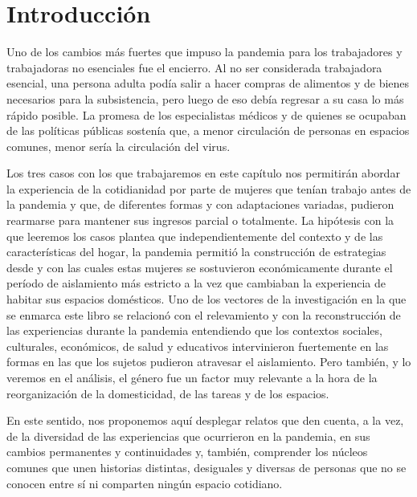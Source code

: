 
\begin{refsection}

\label{cap-28}


\section[Introducción]{Introducción}
\label{cap-28.introduccion}
Uno de los cambios más fuertes que impuso la pandemia para los trabajadores y trabajadoras no esenciales fue el encierro. Al no ser considerada trabajadora esencial, una persona adulta podía salir a hacer compras de alimentos y de bienes necesarios para la subsistencia, pero luego de eso debía regresar a su casa lo más rápido posible. La promesa de los especialistas médicos y de quienes se ocupaban de las políticas públicas sostenía que, a menor circulación de personas en espacios comunes, menor sería la circulación del virus.

Los tres casos con los que trabajaremos en este capítulo nos permitirán abordar la experiencia de la cotidianidad por parte de mujeres que tenían trabajo antes de la pandemia y que, de diferentes formas y con adaptaciones variadas, pudieron rearmarse para mantener sus ingresos parcial o totalmente. La hipótesis con la que leeremos los casos plantea que independientemente del contexto y de las características del hogar, la pandemia permitió la construcción de estrategias desde y con las cuales estas mujeres se sostuvieron económicamente durante el período de aislamiento más estricto a la vez que cambiaban la experiencia de habitar sus espacios domésticos. Uno de los vectores de la investigación en la que se enmarca este libro se relacionó con el relevamiento y con la reconstrucción de las experiencias durante la pandemia entendiendo que los contextos sociales, culturales, económicos, de salud y educativos intervinieron fuertemente en las formas en las que los sujetos pudieron atravesar el aislamiento. Pero también, y lo veremos en el análisis, el género fue un factor muy relevante a la hora de la reorganización de la domesticidad, de las tareas y de los espacios.

En este sentido, nos proponemos aquí desplegar relatos que den cuenta, a la vez, de la diversidad de las experiencias que ocurrieron en la pandemia, en sus cambios permanentes y continuidades y, también, comprender los núcleos comunes que unen historias distintas, desiguales y diversas de personas que no se conocen entre sí ni comparten ningún espacio cotidiano.



\end{refsection}
